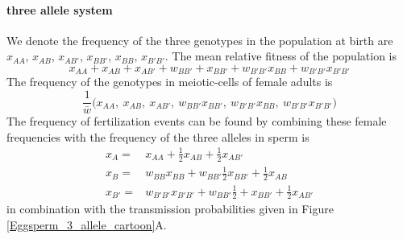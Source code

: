 \documentclass[12pt,letterpaper]{article}
\newcommand{\gc}[1]{{ \color{red} #1}}
\begin{document}
\paragraph{three allele system}
We denote the frequency of the three genotypes in the population at birth are
$x_{AA}$, $x_{AB}$, $x_{AB'}$, $x_{BB'}$, $x_{BB}$, $x_{B'B'}$. 
The mean relative fitness of the population is 
\begin{equation}
x_{AA}+x_{AB}+ x_{AB'}+ w_{BB'} +x_{BB'}+w_{B'B'}x_{BB} + w_{B'B'} x_{B'B'} 
\end{equation}
The frequency of the genotypes in meiotic-cells of female adults is 
\begin{equation}
\frac{1}{\bar{w}}\Big( x_{AA}, ~x_{AB},~ x_{AB'},~ w_{BB'} x_{BB'},~ w_{B'B'}x_{BB},
~w_{B'B'} x_{B'B'} \Big)
\end{equation}
The frequency of fertilization events can be found by combining these
female frequencies with the frequency of the three alleles in sperm is
\begin{eqnarray}
x_A = & x_{AA} + \frac{1}{2} x_{AB}+ \frac{1}{2} x_{AB'} \\
x_B = & w_{BB}  x_{BB} +   w_{BB'} \frac{1}{2} x_{BB'}+ \frac{1}{2} x_{AB} \\
x_{B'} = & w_{B'B'}  x_{B'B'} +   w_{BB'} \frac{1}{2} + x_{BB'}+ \frac{1}{2} x_{AB'}  
\end{eqnarray}
in combination with the transmission probabilities given in Figure
\ref{Eggsperm_3_allele_cartoon}A.



\end{document}
